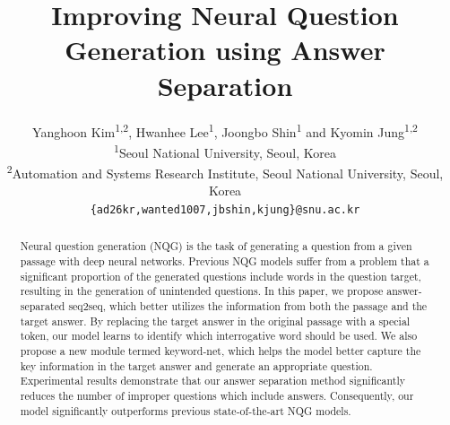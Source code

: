 \documentclass[letterpaper]{article} %
\begin{document}
%
\title{Improving Neural Question Generation using Answer Separation}
\author{Yanghoon Kim\textsuperscript{1,2}, Hwanhee Lee\textsuperscript{1}, Joongbo Shin\textsuperscript{1} and Kyomin Jung\textsuperscript{1,2}\\
  \textsuperscript{1}Seoul National University, Seoul, Korea \\
  \textsuperscript{2}Automation and Systems Research Institute, Seoul National University, Seoul, Korea\\
  {\tt \{ad26kr,wanted1007,jbshin,kjung\}@snu.ac.kr} \\
}
\maketitle
\begin{abstract}
Neural question generation (NQG) is the task of generating a question from a given passage with deep neural networks. Previous NQG models suffer from a problem that a significant proportion of the generated questions include words in the question target, resulting in the generation of unintended questions. In this paper, we propose answer-separated seq2seq, which better utilizes the information from both the passage and the target answer. By replacing the target answer in the original passage with a special token, our model learns to identify which interrogative word should be used. 
We also propose a new module termed keyword-net, which helps the model better capture the key information in the target answer and generate an appropriate question. Experimental results demonstrate that our answer separation method significantly reduces the number of  improper questions which include answers. Consequently, our model significantly outperforms previous state-of-the-art NQG models.


\end{abstract}
\end{document}
